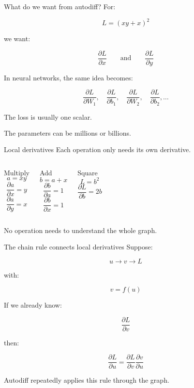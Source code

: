 \documentclass[10pt,aspectratio=169]{beamer}
\newcommand{\grad}[2]{\frac{\partial #1}{\partial #2}}
\begin{document}
\begin{frame}[t]{What do we want from autodiff?}
For:

\[
L=(xy+x)^2
\]

we want:

\[
\boxed{
\grad{L}{x}
\qquad\text{and}\qquad
\grad{L}{y}
}
\]

In neural networks, the same idea becomes:

\[
\grad{L}{W_1},\quad
\grad{L}{b_1},\quad
\grad{L}{W_2},\quad
\grad{L}{b_2},\ldots
\]

The loss is usually one scalar.

The parameters can be millions or billions.
\end{frame}

\begin{frame}[t]{Local derivatives}
Each operation only needs its own derivative.

\begin{columns}[T]
\begin{block}{Multiply}
\[
a=xy
\]
\[
\grad{a}{x}=y
\]
\[
\grad{a}{y}=x
\]
\end{block}

\begin{block}{Add}
\[
b=a+x
\]
\[
\grad{b}{a}=1
\]
\[
\grad{b}{x}=1
\]
\end{block}

\begin{block}{Square}
\[
L=b^2
\]
\[
\grad{L}{b}=2b
\]
\end{block}
\end{columns}

\vfill

No operation needs to understand the whole graph.
\end{frame}

\begin{frame}[t]{The chain rule connects local derivatives}
Suppose:

\[
u \rightarrow v \rightarrow L
\]

with:

\[
v=f(u)
\]

If we already know:

\[
\grad{L}{v}
\]

then:

\[
\boxed{
\grad{L}{u}
=
\grad{L}{v}
\grad{v}{u}
}
\]

Autodiff repeatedly applies this rule through the graph.
\end{frame}
\end{document}
